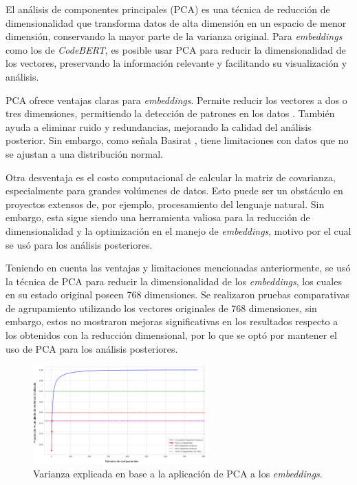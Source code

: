 \documentclass[11pt,a4paper,twoside,openany]{tesis}
\begin{document}
El análisis de componentes principales (PCA) es una técnica de reducción de dimensionalidad que transforma datos de alta dimensión en un espacio de menor dimensión, conservando la mayor parte de la varianza original. Para \emph{embeddings} como los de \emph{CodeBERT}, es posible usar PCA para reducir la dimensionalidad de los vectores, preservando la información relevante y facilitando su visualización y análisis\cite{pca-musil}.

PCA ofrece ventajas claras para \emph{embeddings}. Permite reducir los vectores a dos o tres dimensiones, permitiendo la detección de patrones en los datos \cite{pca-musil}. También ayuda a eliminar ruido y redundancias, mejorando la calidad del análisis posterior. Sin embargo, como señala Basirat \cite{pca-basirat}, tiene limitaciones con datos que no se ajustan a una distribución normal.

Otra desventaja es el costo computacional de calcular la matriz de covarianza, especialmente para grandes volúmenes de datos. Esto puede ser un obstáculo en proyectos extensos de, por ejemplo, procesamiento del lenguaje natural\cite{pca-basirat}. Sin embargo, esta sigue siendo una herramienta valiosa para la reducción de dimensionalidad y la optimización en el manejo de \emph{embeddings}, motivo por el cual se usó para los análisis posteriores.

Teniendo en cuenta las ventajas y limitaciones mencionadas anteriormente, se usó la técnica de PCA para reducir la dimensionalidad de los \emph{embeddings}, los cuales en su estado original poseen 768 dimensiones. Se realizaron pruebas comparativas de agrupamiento utilizando los vectores originales de 768 dimensiones, sin embargo, estos no mostraron mejoras significativas en los resultados respecto a los obtenidos con la reducción dimensional, por lo que se optó por mantener el uso de PCA para los análisis posteriores.

\begin{figure}[H]
    \centering
    \includegraphics[width=0.6\textwidth]{imagenes/varianza-explicada.png}
    \caption{Varianza explicada en base a la aplicación de PCA a los \emph{embeddings}.}
    \label{varianzaPCA}
\end{figure}
\end{document}
